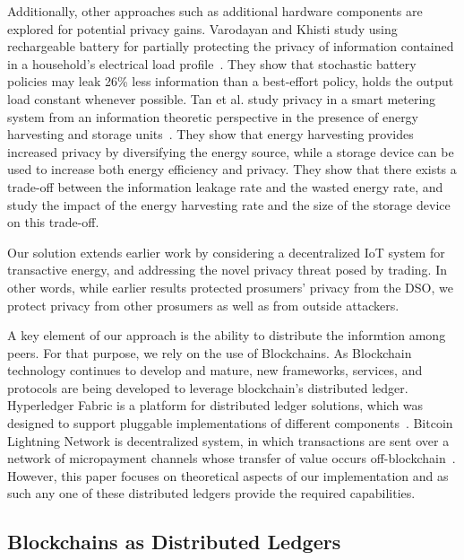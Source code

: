 Additionally, other approaches such as additional hardware components are explored for potential privacy gains. Varodayan and Khisti study using rechargeable battery for partially protecting the privacy of information contained in a household's electrical load profile~\cite{varodayan2011smart}. They show that stochastic battery policies may leak 26\% less information than a best-effort policy, holds the output load constant whenever possible. Tan et al. study privacy in a smart metering system from an information theoretic perspective in the presence of energy harvesting and storage units~\cite{tan2013increasing}. They show that energy harvesting provides increased privacy by diversifying the energy source, while a storage device can be used to increase both energy efficiency and privacy. They show that there exists a trade-off between the information leakage rate and the wasted energy rate, and study the impact of the energy harvesting rate and the size of the storage device on this trade-off.

Our solution extends earlier work by considering a decentralized IoT system for transactive energy, and addressing the novel privacy threat posed by trading. In other words, while earlier results protected prosumers' privacy from the DSO, we protect privacy from other prosumers as well as from outside attackers. 

A key element of our approach is the ability to distribute the informtion among peers. For that purpose, we rely on the use of Blockchains. 
As Blockchain technology continues to develop and mature, new frameworks, services, and protocols are being developed to leverage blockchain's distributed ledger. Hyperledger Fabric is a platform for distributed ledger solutions, which was designed to support pluggable implementations of different components~\cite{hyperledger2017fabric}. Bitcoin Lightning Network is decentralized system, in which transactions are sent over a network of micropayment channels whose transfer of value occurs off-blockchain~\cite{poon2016bitcoin}. However, this paper focuses on theoretical aspects of our implementation and as such any one of these distributed ledgers provide the required capabilities.



\iffalse
\subsection{Blockchains as Distributed Ledgers}

